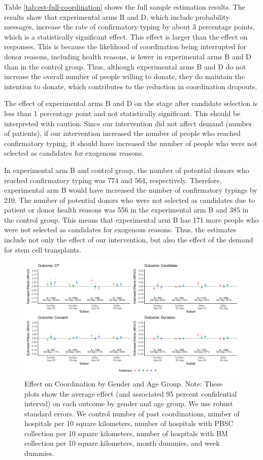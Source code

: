 \documentclass[
]{article}
\begin{document}
Table \ref{tab:est-full-coordination} shows the full sample estimation results. The results show that experimental arms B and D, which include probability messages, increase the rate of confirmatory typing by about 3 percentage points, which is a statistically significant effect. This effect is larger than the effect on responses. This is because the likelihood of coordination being interrupted for donor reasons, including health reasons, is lower in experimental arms B and D than in the control group. Thus, although experimental arms B and D do not increase the overall number of people willing to donate, they do maintain the intention to donate, which contributes to the reduction in coordination dropouts.

The effect of experimental arms B and D on the stage after candidate selection is less than 1 percentage point and not statistically significant. This should be interpreted with caution. Since our intervention did not affect demand (number of patients), if our intervention increased the number of people who reached confirmatory typing, it should have increased the number of people who were not selected as candidates for exogenous reasons.

In experimental arm B and control group, the number of potential donors who reached confirmatory typing was 774 and 564, respectively. Therefore, experimental arm B would have increased the number of confirmatory typings by 210. The number of potential donors who were not selected as candidates due to patient or donor health reasons was 556 in the experimental arm B and 385 in the control group. This means that experimental arm B has 171 more people who were not selected as candidates for exogenous reasons. Thus, the estimates include not only the effect of our intervention, but also the effect of the demand for stem cell transplants.

\begin{figure}[t]
\includegraphics{robustness-body_files/figure-latex/coefplot-reg-subsample-coordination-1} \caption{Effect on Coordination by Gender and Age Group. Note: These plots show the average effect (and associated 95 percent confidential interval) on each outcome by gender and age group. We use robust standard errors. We control number of past coordinations, number of hospitals per 10 square kilometers, number of hospitals with PBSC collection per 10 square kilometers, number of hospitals with BM collection per 10 square kilometers, month dummies, and week dummies.}\label{fig:coefplot-reg-subsample-coordination}
\end{figure}
\end{document}
